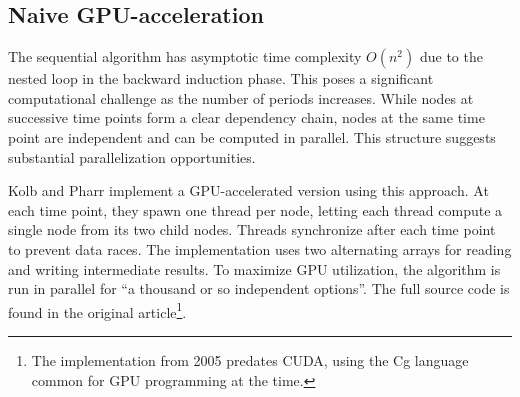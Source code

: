 \documentclass[english,12pt,a4paper,pdftex,sci,utf8]{aaltothesis}
\begin{document}
\subsection{Naive GPU-acceleration}
The sequential algorithm has asymptotic time complexity $O(n^2)$ due to the nested loop in the backward induction phase. This poses a significant computational challenge as the number of periods increases. While nodes at successive time points form a clear dependency chain, nodes at the same time point are independent and can be computed in parallel. This structure suggests substantial parallelization opportunities.

Kolb and Pharr \cite{pharr2005gpu} implement a GPU-accelerated version using this approach. At each time point, they spawn one thread per node, letting each thread compute a single node from its two child nodes. Threads synchronize after each time point to prevent data races. The implementation uses two alternating arrays for reading and writing intermediate results. To maximize GPU utilization, the algorithm is run in parallel for ``a thousand or so independent options''. The full source code is found in the original article\footnote{The implementation from 2005 predates CUDA, using the Cg language common for GPU programming at the time.}.
\end{document}
